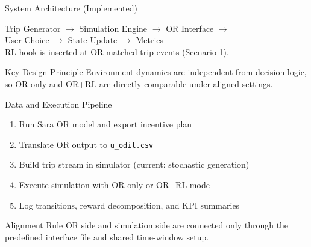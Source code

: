 ﻿\documentclass[aspectratio=169]{beamer}
\newcommand{\tightlist}{\setlength{\itemsep}{4pt}\setlength{\parskip}{0pt}}
\begin{document}
\begin{frame}{System Architecture (Implemented)}
\begin{center}
\small
Trip Generator $\rightarrow$ Simulation Engine $\rightarrow$ OR Interface $\rightarrow$\\
User Choice $\rightarrow$ State Update $\rightarrow$ Metrics \\
\vspace{0.8em}
\normalsize
RL hook is inserted at OR-matched trip events (Scenario 1).
\end{center}

\vspace{0.8em}
\begin{block}{Key Design Principle}
Environment dynamics are independent from decision logic, so OR-only and OR+RL are directly comparable under aligned settings.
\end{block}
\end{frame}

\begin{frame}{Data and Execution Pipeline}
\begin{enumerate}\tightlist
  \item Run Sara OR model and export incentive plan
  \item Translate OR output to \texttt{u\_odit.csv}
  \item Build trip stream in simulator (current: stochastic generation)
  \item Execute simulation with OR-only or OR+RL mode
  \item Log transitions, reward decomposition, and KPI summaries
\end{enumerate}

\vspace{0.6em}
\begin{exampleblock}{Alignment Rule}
OR side and simulation side are connected only through the predefined interface file and shared time-window setup.
\end{exampleblock}
\end{frame}
\end{document}
